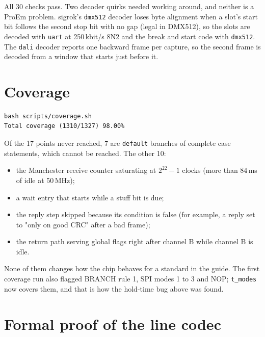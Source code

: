 \documentclass[11pt,a4paper]{article}
\newcommand{\sig}[1]{\texttt{#1}}
\begin{document}
All 30 checks pass. Two decoder quirks needed working around, and neither is a ProEm problem. sigrok's \sig{dmx512} decoder loses byte alignment when a slot's start bit follows the second stop bit with no gap (legal in DMX512), so the slots are decoded with \sig{uart} at 250\,kbit/s 8N2 and the break and start code with \sig{dmx512}. The \sig{dali} decoder reports one backward frame per capture, so the second frame is decoded from a window that starts just before it.

\section{Coverage}

\begin{lstlisting}
bash scripts/coverage.sh
Total coverage (1310/1327) 98.00%
\end{lstlisting}

Of the 17 points never reached, 7 are \sig{default} branches of complete case statements, which cannot be reached. The other 10:
\begin{itemize}
\item the Manchester receive counter saturating at $2^{22}-1$ clocks (more than 84\,ms of idle at 50\,MHz);
\item a wait entry that starts while a stuff bit is due;
\item the reply step skipped because its condition is false (for example, a reply set to "only on good CRC" after a bad frame);
\item the return path serving global flags right after channel B while channel B is idle.
\end{itemize}
None of them changes how the chip behaves for a standard in the guide. The first coverage run also flagged BRANCH rule 1, SPI modes 1 to 3 and NOP; \sig{t\_modes} now covers them, and that is how the hold-time bug above was found.

\section{Formal proof of the line codec}
\end{document}

